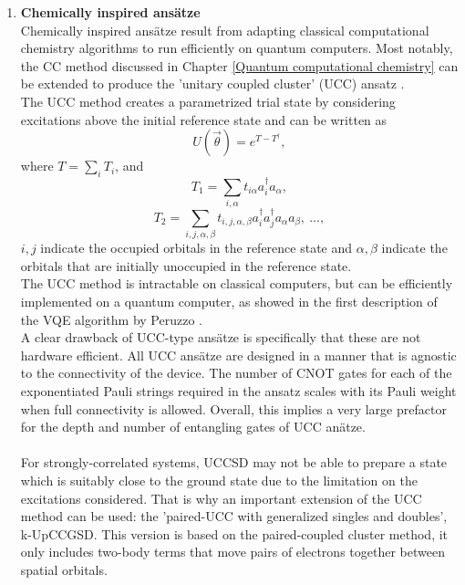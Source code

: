 \begin{enumerate}
    \item \textbf{Chemically inspired ansätze} \\
    Chemically inspired ansätze result from adapting classical computational chemistry algorithms to run efficiently on quantum computers. Most notably, the CC method discussed in Chapter \ref{Quantum computational chemistry} can be extended to produce the 'unitary coupled cluster' (UCC) ansatz \cite{Anand2022Mar}. \\
    The UCC method creates a parametrized trial state by considering excitations above the initial reference state and can be written as
    \begin{equation}
        U(\vec{\theta}) = e^{T-T^{\dagger}},
    \end{equation}
    where $T = \sum_i T_i$, and
    \begin{equation}
        T_1 = \sum_{i,\alpha} t_{i\alpha} a^\dagger_i a_\alpha,
    \end{equation}
    \begin{equation}
        T_2 = \sum_{i,j,\alpha,\beta} t_{i,j,\alpha,\beta} a^\dagger_i a^\dagger_j a_\alpha a_\beta, \ ...,
    \end{equation}
    $i,j$ indicate the occupied orbitals in the reference state and $\alpha,\beta$ indicate the orbitals that are initially unoccupied in the reference state. \\
    The UCC method is intractable on classical computers, but can be efficiently implemented on a quantum computer, as showed in the first description of the VQE algorithm by Peruzzo \cite{Peruzzo2014Jul}. \\
    A clear drawback of UCC-type ansätze is specifically that these are not hardware efficient. All UCC ansätze are designed in a manner that is agnostic to the connectivity of the device. The number of CNOT gates for each of the exponentiated Pauli strings required in the ansatz scales with its Pauli weight when full connectivity is allowed. Overall, this implies a very large prefactor for the depth and number of entangling gates of UCC anätze. \\
    \\
    For strongly-correlated systems, UCCSD may not be able to prepare a state which is suitably close to the ground state due to the limitation on the excitations considered. That is why an important extension of the UCC method can be used: the 'paired-UCC with generalized singles and doubles', k-UpCCGSD. This version is based on the paired-coupled cluster method, it only includes two-body terms that move pairs of electrons together between spatial orbitals. \\

\end{enumerate}
